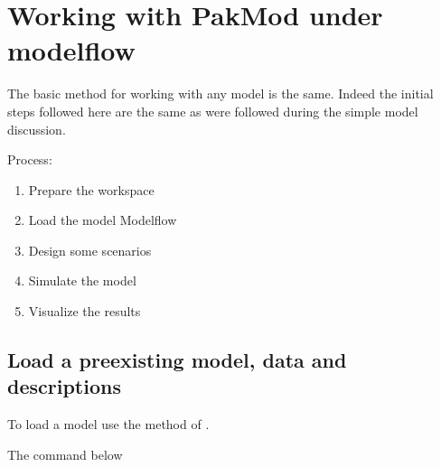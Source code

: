 \documentclass[letterpaper,10pt,english]{jupyterBook}
\begin{document}
\section{Working with PakMod under modelflow}
\label{\detokenize{content/06_WBModels/LoadingWBModel:working-with-pakmod-under-modelflow}}
\sphinxAtStartPar
The basic method for working with any model is the same. Indeed the initial steps followed here are the same as were followed during the simple model discussion.

\sphinxAtStartPar
Process:
\begin{enumerate}
%
\item {} 
\sphinxAtStartPar
Prepare the workspace

\item {} 
\sphinxAtStartPar
Load the model Modelflow

\item {} 
\sphinxAtStartPar
Design some scenarios

\item {} 
\sphinxAtStartPar
Simulate the model

\item {} 
\sphinxAtStartPar
Visualize the results

\end{enumerate}


\subsection{Load a pre\sphinxhyphen{}existing model, data and descriptions}
\label{\detokenize{content/06_WBModels/LoadingWBModel:load-a-pre-existing-model-data-and-descriptions}}
\sphinxAtStartPar
To load a model use the  method of .

\sphinxAtStartPar
The command below

\begin{sphinxVerbatim}[commandchars=\\\{\}]
    
\end{sphinxVerbatim}
\end{document}
